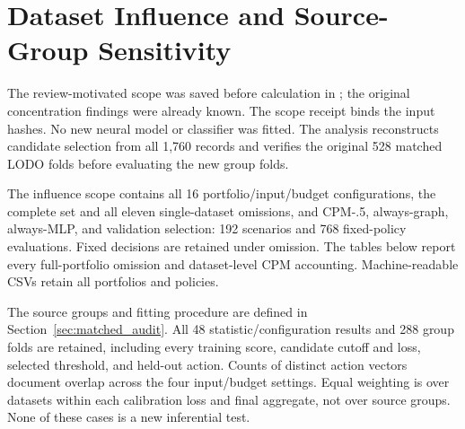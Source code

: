 \section{Dataset Influence and Source-Group Sensitivity}
\label{app:source_sensitivity}

The review-motivated scope was saved before calculation in ; the original concentration findings were already known. The scope receipt binds the input hashes. No new neural model or classifier was fitted. The analysis reconstructs candidate selection from all 1,760 records and verifies the original 528 matched LODO folds before evaluating the new group folds.

The influence scope contains all 16 portfolio/input/budget configurations, the complete set and all eleven single-dataset omissions, and CPM-.5, always-graph, always-MLP, and validation selection: 192 scenarios and 768 fixed-policy evaluations. Fixed decisions are retained under omission. The tables below report every full-portfolio omission and dataset-level CPM accounting. Machine-readable CSVs retain all portfolios and policies.

The source groups and fitting procedure are defined in Section~\ref{sec:matched_audit}. All 48 statistic/configuration results and 288 group folds are retained, including every training score, candidate cutoff and loss, selected threshold, and held-out action. Counts of distinct action vectors document overlap across the four input/budget settings. Equal weighting is over datasets within each calibration loss and final aggregate, not over source groups. None of these cases is a new inferential test.


